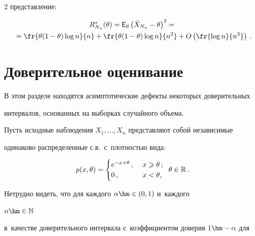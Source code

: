 \begin{multicols}{2}
представление:


\begin{multline*}


R^*_{N_n}(\theta) = {\sf E}_\theta \left(\bar X_{N_n} - \theta\right)^2 ={}\\


{}=


\fr{\theta(1 - \theta)\log n}{n} + \fr{\theta(1 - \theta)\log n}{n^2} + 


 O\left(\fr{\log n}{n^3}\right)\,.


\end{multline*}








\section{Доверительное оценивание}





В этом разделе находятся асимптотические дефекты некоторых доверительных 


интервалов, основанных на выборках случайного объема.





Пусть исходные наблюдения $X_1,\ldots,X_n$ представляют собой независимые 


одинаково распределенные с.в.\ с~плотностью вида:


\begin{equation}


p(x,\theta) = \begin{cases}


e^{-x + \theta}\,, &\  x \geqslant \theta\,;\\


0\,, &\  x < \theta,


\end{cases}\enskip


\theta \in \mathbb{R}\,.


\label{e3.1}


\end{equation}


Нетрудно видеть, что для каждого $\alpha\hm \in (0,1)$ и~каж\-до\-го 


$n\hm \in \mathbb{N}$ 


в~качестве доверительного интервала с~коэффициентом доверия $1\hm - \alpha$ для 



\end{multicols}
